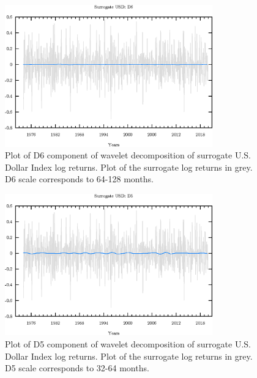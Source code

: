 \begin{figure}
\begin{center}
\includegraphics[width=0.8\textwidth]{./code/plot/surrogate_usd_wr_D6.eps}
\caption{Plot of D6 component of wavelet decomposition of surrogate U.S. Dollar Index log returns. 
	Plot of the surrogate log returns in grey. D6 scale corresponds to 64-128 months.}
\end{center}
\label{fig:s-usd-wr-d6}
\end{figure}

\begin{figure}
\begin{center}
\includegraphics[width=0.8\textwidth]{./code/plot/surrogate_usd_wr_D5.eps}
\caption{Plot of D5 component of wavelet decomposition of surrogate U.S. Dollar Index log returns. 
	Plot of the surrogate log returns in grey. D5 scale corresponds to 32-64 months.}
\end{center}
\label{fig:s-usd-wr-d5}
\end{figure}

